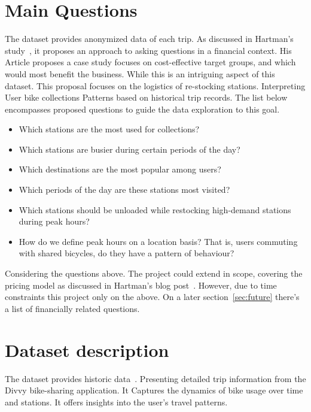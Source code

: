 \documentclass[12pt, a4paper]{article}
\begin{document}
    \section*{Main Questions}
    \label{sec:questions}

    The dataset provides anonymized data of each trip.\newline
    As discussed in Hartman's study~\cite{Hartman2021}, it proposes an approach to asking questions in a financial context. His Article proposes a case study focuses on cost-effective target groups, and which would most benefit the business.\newline
    While this is an intriguing aspect of this dataset. This proposal focuses on the logistics of re-stocking stations. Interpreting User bike collections Patterns based on historical trip records. The list below encompasses proposed questions to guide the data exploration to this goal.

    \begin{itemize}
        \item Which stations are the most used for collections?
        \item Which stations are busier during certain periods of the day?
        \item Which destinations are the most popular among users?
        \item Which periods of the day are these stations most visited?
        \item Which stations should be unloaded while restocking high-demand stations during peak hours?
        \item How do we define peak hours on a location basis? That is, users commuting with shared bicycles, do they have a pattern of behaviour?
    \end{itemize}

    Considering the questions above. The project could extend in scope, covering the pricing model as discussed in Hartman's blog post~\cite{Hartman2021}. However, due to time constraints this project only on the above. On a later section~\ref{sec:future} there's a list of financially related questions.

    \section*{Dataset description}
    \label{sec:dataset}

    The dataset provides historic data~\cite{DataIndex}. Presenting detailed trip information from the Divvy bike-sharing application.\newline
    It Captures the dynamics of bike usage over time and stations. It offers insights into the user's travel patterns.\newline
\end{document}
